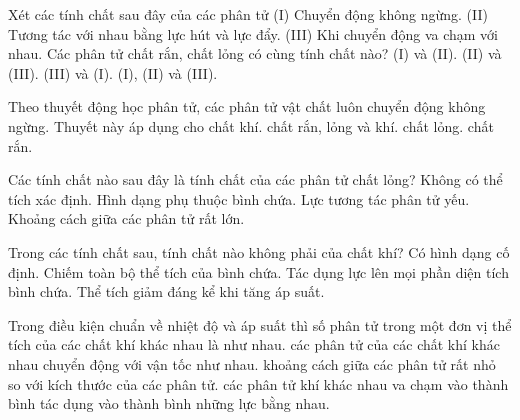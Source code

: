\begin{ex}
Xét các tính chất sau đây của các phân tử
(I) Chuyển động không ngừng.
(II) Tương tác với nhau bằng lực hút và lực đẩy.
(III) Khi chuyển động va chạm với nhau.
Các phân tử chất rắn, chất lỏng có cùng tính chất nào?
\choice
{\True (I) và (II).}
{(II) và (III).}
{(III) và (I).}
{(I), (II) và (III).}
\end{ex}

\begin{ex}
Theo thuyết động học phân tử, các phân tử vật chất luôn chuyển động không ngừng. Thuyết này áp dụng cho
\choice
{chất khí.}
{\True chất rắn, lỏng và khí.}
{chất lỏng.}
{chất rắn.}
\end{ex}


\begin{ex}
Các tính chất nào sau đây là tính chất của các phân tử chất lỏng?
\choice
{Không có thể tích xác định.}
{\True Hình dạng phụ thuộc bình chứa.}
{Lực tương tác phân tử yếu.}
{Khoảng cách giữa các phân tử rất lớn.}
\end{ex}

\begin{ex}
Trong các tính chất sau, tính chất nào không phải của chất khí?
\choice
{\True Có hình dạng cố định.}
{Chiếm toàn bộ thể tích của bình chứa.}
{Tác dụng lực lên mọi phần diện tích bình chứa.}
{Thể tích giảm đáng kể khi tăng áp suất.}
\end{ex}

\begin{ex}
Trong điều kiện chuẩn về nhiệt độ và áp suất thì
\choice
{\True số phân tử trong một đơn vị thể tích của các chất khí khác nhau là như nhau.}
{các phân tử của các chất khí khác nhau chuyển động với vận tốc như nhau.}
{khoảng cách giữa các phân tử rất nhỏ so với kích thước của các phân tử.}
{các phân tử khí khác nhau va chạm vào thành bình tác dụng vào thành bình những lực bằng nhau.}
\end{ex}



